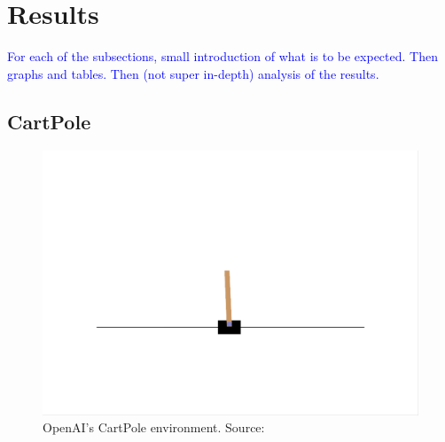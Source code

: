 \documentclass{article}
\newcommand{\TODO}[1]{\textcolor{blue}{#1}}
\begin{document}
\section{Results}
\label{sec:res}

\TODO{
    For each of the subsections, small introduction of what is to be expected.
    Then graphs and tables.
    Then (not super in-depth) analysis of the results.
}

\subsection{CartPole}
\label{ssec:cp}
\begin{figure}[htbp]
    \centering
    \includegraphics[width=0.9\linewidth]{figs/cartpole.png}
    \caption{
        OpenAI's CartPole environment. 
        Source: \cite{gymlibraryCartPole}
    }
    \label{fig:cartpole}
\end{figure}
\end{document}

